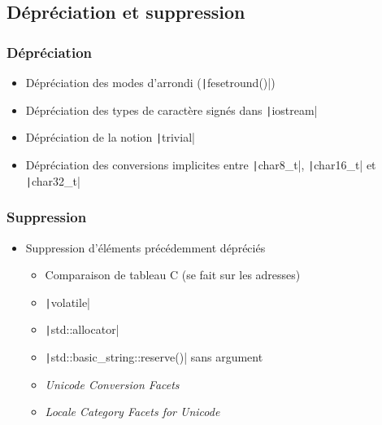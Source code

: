 \documentclass[C++.tex]{subfiles}
\begin{document}
\subsection*{Dépréciation et suppression}
\begin{frame}[fragile]
	\frametitle{Dépréciation}
	\begin{itemize}
		\item Dépréciation des modes d'arrondi (\texttt|fesetround()|)
		\item Dépréciation des types de caractère signés dans \texttt|iostream|
		\item Dépréciation de la notion \texttt|trivial|
		\item Dépréciation des conversions implicites entre \texttt|char8_t|, \texttt|char16_t| et \texttt|char32_t|
	\end{itemize}
\end{frame}

\begin{frame}[fragile]
	\frametitle{Suppression}
	\begin{itemize}
		\item Suppression d'éléments précédemment dépréciés
		\begin{itemize}
			\item Comparaison de tableau C (se fait sur les adresses)
			\item \texttt|volatile|
			\item \texttt|std::allocator|
			\item \texttt|std::basic_string::reserve()| sans argument
			\item \textit{Unicode Conversion Facets}
			\item \textit{Locale Category Facets for Unicode}
		\end{itemize}
	\end{itemize}
\end{frame}
\end{document}
